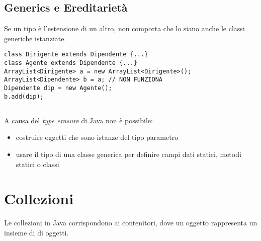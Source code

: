 \subsection*{Generics e Ereditarietà}
Se un tipo è l'estensione di un altro, non comporta che lo siano anche le classi generiche istanziate. 
\begin{verbatim}
class Dirigente extends Dipendente {...}
class Agente extends Dipendente {...}
ArrayList<Dirigente> a = new ArrayList<Dirigente>();
ArrayList<Dipendente> b = a; // NON FUNZIONA
Dipendente dip = new Agente();
b.add(dip); 
\end{verbatim}

\subsection*{}
A causa del \textit{type erasure} di Java non è possibile:
\begin{itemize}
\item costruire oggetti che sono istanze del tipo parametro
\item usare il tipo di una classe generica per definire campi dati statici, metodi statici o classi
\end{itemize}

\section{Collezioni}
Le collezioni in Java corrispondono ai contenitori, dove un oggetto rappresenta un insieme di di oggetti.
